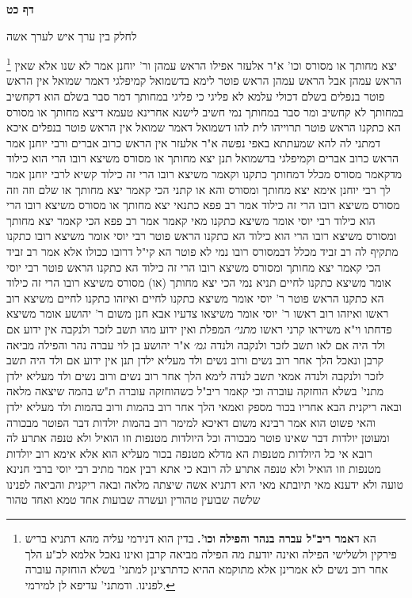 \documentclass[12pt, openany]{book}
\newcommand{\sethebfont}{
\fontsize{10.5pt}{21.0pt} \selectfont
}
\newcommand{\twocol}[1]{
	{\sethebfont \begin{multicols}{2}
			#1
	\end{multicols}}	
}
\newcommand{\sectname}{}
\newcommand{\newsection}[1]{
	\addcontentsline{toc}{section}{#1}
	\renewcommand{\sectname}{#1}	
	\vspace{-\baselineskip}
	\begin{center}
		\textbf{%
\fontsize{16pt}{16pt}\selectfont
			#1}
	\end{center}
	\vspace{-\baselineskip}
	\nopagebreak
}
\newcommand{\footnotecomment}[1]{
	\renewcommand\thefootnote{}
	\footnote{#1}}
\newcommand{\commenta}[1]{\footnotecomment{#1}}
\begin{document}
\newsection{דף כט}
\twocol{לחלק בין ערך איש לערך אשה
\commenta{ הא ד\textbf{אמר ריב"ל עברה בנהר והפילה וכו'.} בדין הוא דנירמי עליה מהא דתניא בריש פירקין ולשלישי הפילה ואינה יודעת מה הפילה מביאה קרבן ואינו נאכל אלמא לכ"ע הלך אחר רוב נשים לא אמרינן אלא מתוקמא ההיא כדתרצינן למתני' בשלא הוחזקה עוברה לפנינו. ודמתני' עדיפא לן למירמי. }
יצא מחותך או מסורס וכו' א"ר אלעזר אפילו הראש עמהן 
ור' יוחנן אמר לא שנו אלא שאין הראש עמהן אבל הראש עמהן הראש פוטר 
לימא בדשמואל קמיפלגי דאמר שמואל אין הראש פוטר בנפלים 
בשלם דכולי עלמא לא פליגי כי פליגי במחותך דמר סבר בשלם הוא דקחשיב במחותך לא קחשיב ומר סבר במחותך נמי חשיב 
לישנא אחרינא טעמא דיצא מחותך או מסורס הא כתקנו הראש פוטר תרוייהו לית להו דשמואל דאמר שמואל אין הראש פוטר בנפלים 
איכא דמתני לה להא שמעתתא באפי נפשה א"ר אלעזר אין הראש כרוב אברים ורבי יוחנן אמר הראש כרוב אברים וקמיפלגי בדשמואל 
תנן יצא מחותך או מסורס משיצא רובו הרי הוא כילוד מדקאמר מסורס מכלל דמחותך כתקנו וקאמר משיצא רובו הרי זה כילוד קשיא לרבי יוחנן 
אמר לך רבי יוחנן אימא יצא מחותך ומסורס 
והא או קתני הכי קאמר יצא מחותך או שלם וזה וזה מסורס משיצא רובו הרי זה כילוד 
אמר רב פפא כתנאי יצא מחותך או מסורס משיצא רובו הרי הוא כילוד רבי יוסי אומר משיצא כתקנו מאי קאמר 
אמר רב פפא הכי קאמר יצא מחותך ומסורס משיצא רובו הרי הוא כילוד הא כתקנו הראש פוטר רבי יוסי אומר משיצא רובו כתקנו 
מתקיף לה רב זביד מכלל דבמסורס רובו נמי לא פוטר הא קי"ל דרובו ככולו 
אלא אמר רב זביד הכי קאמר יצא מחותך ומסורס משיצא רובו הרי זה כילוד הא כתקנו הראש פוטר רבי יוסי אומר משיצא כתקנו לחיים 
תניא נמי הכי יצא מחותך (או) מסורס משיצא רובו הרי זה כילוד הא כתקנו הראש פוטר ר' יוסי אומר משיצא כתקנו לחיים 
ואיזהו כתקנו לחיים משיצא רוב ראשו ואיזהו רוב ראשו ר' יוסי אומר משיצאו צדעיו אבא חנן משום ר' יהושע אומר משיצא פדחתו וי"א משיראו קרני ראשו
{\large\emph{מתני׳}} המפלת ואין ידוע מהו תשב לזכר ולנקבה אין ידוע אם ולד היה אם לאו תשב לזכר ולנקבה ולנדה
{\large\emph{גמ׳}} א"ר יהושע בן לוי עברה נהר והפילה מביאה קרבן ונאכל הלך אחר רוב נשים ורוב נשים ולד מעליא ילדן 
תנן אין ידוע אם ולד היה תשב לזכר ולנקבה ולנדה אמאי תשב לנדה לימא הלך אחר רוב נשים ורוב נשים ולד מעליא ילדן 
מתני' בשלא הוחזקה עוברה וכי קאמר ריב"ל כשהוחזקה עוברה 
ת"ש בהמה שיצאה מלאה ובאה ריקנית הבא אחריו בכור מספק 
ואמאי הלך אחר רוב בהמות ורוב בהמות ולד מעליא ילדן והאי פשוט הוא 
אמר רבינא משום דאיכא למימר רוב בהמות יולדות דבר הפוטר מבכורה ומעוטן יולדות דבר שאינו פוטר מבכורה וכל היולדות מטנפות וזו הואיל ולא טנפה אתרע לה רובא 
אי כל היולדות מטנפות הא מדלא מטנפה בכור מעליא הוא אלא אימא רוב יולדות מטנפות וזו הואיל ולא טנפה אתרע לה רובא 
כי אתא רבין אמר מתיב רבי יוסי ברבי חנינא טועה ולא ידענא מאי תיובתא מאי היא דתניא
אשה שיצתה מלאה ובאה ריקנית והביאה לפנינו שלשה שבועין טהורין ועשרה שבועות אחד טמא ואחד טהור
}
\end{document}

